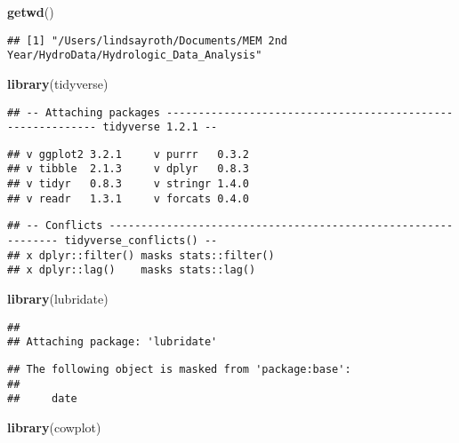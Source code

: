 \documentclass[]{article}
\newenvironment{Shaded}{\begin{snugshade}}{\end{snugshade}}
\newcommand{\KeywordTok}[1]{\textcolor[rgb]{0.13,0.29,0.53}{\textbf{#1}}}
\newcommand{\NormalTok}[1]{#1}
\begin{document}
\begin{Shaded}
\begin{Highlighting}[]
\KeywordTok{getwd}\NormalTok{()}
\end{Highlighting}
\end{Shaded}

\begin{verbatim}
## [1] "/Users/lindsayroth/Documents/MEM 2nd Year/HydroData/Hydrologic_Data_Analysis"
\end{verbatim}

\begin{Shaded}
\begin{Highlighting}[]
\KeywordTok{library}\NormalTok{(tidyverse)}
\end{Highlighting}
\end{Shaded}

\begin{verbatim}
## -- Attaching packages ----------------------------------------------------------- tidyverse 1.2.1 --
\end{verbatim}

\begin{verbatim}
## v ggplot2 3.2.1     v purrr   0.3.2
## v tibble  2.1.3     v dplyr   0.8.3
## v tidyr   0.8.3     v stringr 1.4.0
## v readr   1.3.1     v forcats 0.4.0
\end{verbatim}

\begin{verbatim}
## -- Conflicts -------------------------------------------------------------- tidyverse_conflicts() --
## x dplyr::filter() masks stats::filter()
## x dplyr::lag()    masks stats::lag()
\end{verbatim}

\begin{Shaded}
\begin{Highlighting}[]
\KeywordTok{library}\NormalTok{(lubridate)}
\end{Highlighting}
\end{Shaded}

\begin{verbatim}
## 
## Attaching package: 'lubridate'
\end{verbatim}

\begin{verbatim}
## The following object is masked from 'package:base':
## 
##     date
\end{verbatim}

\begin{Shaded}
\begin{Highlighting}[]
\KeywordTok{library}\NormalTok{(cowplot)}
\end{Highlighting}
\end{Shaded}
\end{document}
